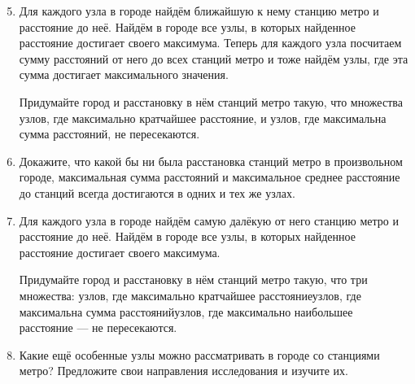 \begin{enumerate} \setcounter{enumi}{4}

\item Для каждого узла в городе найдём ближайшую к нему станцию метро и расстояние до неё. Найдём в городе все узлы, в которых найденное расстояние достигает своего максимума. Теперь для каждого узла посчитаем сумму расстояний от него до всех станций метро и тоже найдём узлы, где эта сумма достигает максимального значения.

\smallskip\noindent Придумайте город и расстановку в нём станций метро такую, что множества узлов, где максимально кратчайшее расстояние, и узлов, где максимальна сумма расстояний, не пересекаются.

\item Докажите, что какой бы ни была расстановка станций метро в произвольном городе, максимальная сумма расстояний и максимальное среднее расстояние до станций всегда достигаются в одних и тех же узлах.

\item Для каждого узла в городе найдём самую далёкую от него станцию метро и расстояние до неё. Найдём в городе все узлы, в которых найденное расстояние достигает своего максимума.

\smallskip\noindent Придумайте город и расстановку в нём станций метро такую, что три множества: узлов, где максимально кратчайшее расстояние\scolon узлов, где максимальна сумма расстояний\scolon узлов, где максимально наибольшее расстояние — не пересекаются.

\item Какие ещё особенные узлы можно рассматривать в городе со станциями метро?  Предложите свои направления исследования и изучите их.

\end{enumerate}
